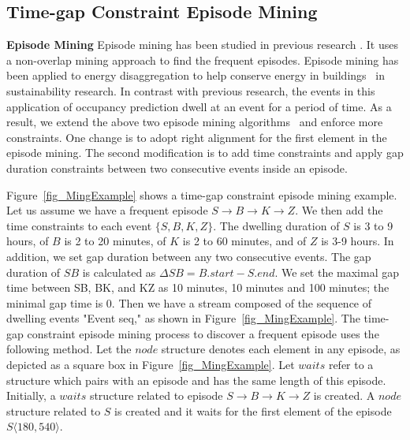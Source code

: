 \subsection{Time-gap Constraint Episode Mining}
\textbf{Episode Mining}
Episode mining has been studied in previous research \cite{mannila1997discovery}. 
It uses a non-overlap mining approach to find the frequent episodes. 
Episode mining has been applied to energy disaggregation to help conserve energy in buildings~\cite{shao2013temporal} in sustainability research. 
In contrast with previous research, 
the events in this application of occupancy prediction 
dwell at an event for a period of time. 
As a result, we extend the above two 
episode mining algorithms~\cite{laxman2008stream,patnaik2008inferring} 
and enforce more constraints.
One change is to 
adopt right alignment for the first element in the episode mining. 
The second modification is to 
add time constraints and 
apply gap duration constraints between 
two consecutive events inside an episode. 
%

Figure~\ref{fig_MingExample} shows a time-gap constraint episode mining example. 
Let us assume we have a frequent episode $S\rightarrow B \rightarrow K\rightarrow Z$. 
We then add the time constraints to each event $\{S,B,K,Z\}$. 
The dwelling duration of $S$ is 3 to 9 hours,   
of $B$ is 2 to 20 minutes, 
of $K$ is 2 to 60 minutes, 
and of $Z$ is 3-9 hours. 
In addition, we set gap duration between any two consecutive events. 
The gap duration of $SB$ is calculated as $\Delta{SB} = B.start-S.end$. 
We set the maximal gap time between SB, BK, and KZ as 
10 minutes, 10 minutes and 100 minutes; 
the minimal gap time is 0. 
Then we have a stream composed of the sequence of dwelling events "Event seq," as shown 
in Figure~\ref{fig_MingExample}.  
 The time-gap constraint episode mining process 
 to discover a frequent episode uses the following method. 
 Let the $node$ structure denotes each element in any episode,  
as depicted as a square box in Figure~\ref{fig_MingExample}.  
Let $waits$ refer to a structure which pairs with an episode 
and has the same length of this episode. 
Initially, a $waits$ structure related to episode $S\rightarrow B \rightarrow K\rightarrow Z$ is created. 
A $node$ structure related to $S$ is created 
and it waits for the first 
element of the episode $S\langle 180, 540 \rangle $. 
